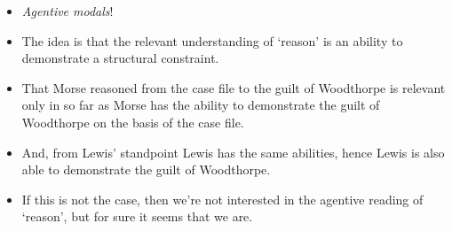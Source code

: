 \documentclass[10pt]{article}
\begin{document}
\begin{itemize}
\item \emph{Agentive modals}!
\item The idea is that the relevant understanding of `reason' is an ability to demonstrate a structural constraint.
\item That Morse reasoned from the case file to the guilt of Woodthorpe is relevant only in so far as Morse has the ability to demonstrate the guilt of Woodthorpe on the basis of the case file.
\item And, from Lewis' standpoint Lewis has the same abilities, hence Lewis is also able to demonstrate the guilt of Woodthorpe.
\item If this is not the case, then we're not interested in the agentive reading of `reason', but for sure it seems that we are.
\end{itemize}

\newpage


\printbibliography
\end{document}
